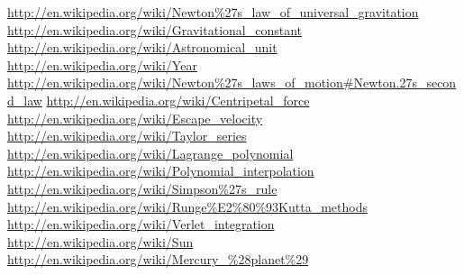 \documentclass[11pt,english,a4paper]{article}
\begin{document}
\begin{flushleft}
\begin{thebibliography}{1}
\href{http://en.wikipedia.org/wiki/Newton\%27s\_law\_of\_universal\_gravitation}{http://en.wikipedia.org/wiki/Newton\%27s\_law\_of\_universal\_gravitation}
\href{http://en.wikipedia.org/wiki/Gravitational\_constant}{http://en.wikipedia.org/wiki/Gravitational\_constant}
\href{http://en.wikipedia.org/wiki/Astronomical\_unit}{http://en.wikipedia.org/wiki/Astronomical\_unit}
\href{http://en.wikipedia.org/wiki/Year}{http://en.wikipedia.org/wiki/Year}
\href{http://en.wikipedia.org/wiki/Newton\%27s\_laws\_of\_motion\#Newton.27s\_second\_law}{http://en.wikipedia.org/wiki/Newton\%27s\_laws\_of\_motion\#Newton.27s\_second\_law}
\href{http://en.wikipedia.org/wiki/Centripetal\_force}{http://en.wikipedia.org/wiki/Centripetal\_force}
\href{http://en.wikipedia.org/wiki/Escape\_velocity}{http://en.wikipedia.org/wiki/Escape\_velocity}
\href{http://en.wikipedia.org/wiki/Taylor\_series}{http://en.wikipedia.org/wiki/Taylor\_series}
\href{http://en.wikipedia.org/wiki/Lagrange\_polynomial}{http://en.wikipedia.org/wiki/Lagrange\_polynomial}
\href{http://en.wikipedia.org/wiki/Polynomial\_interpolation}{http://en.wikipedia.org/wiki/Polynomial\_interpolation}
\href{http://en.wikipedia.org/wiki/Simpson\%27s\_rule}{http://en.wikipedia.org/wiki/Simpson\%27s\_rule}
\href{http://en.wikipedia.org/wiki/Runge\%E2\%80\%93Kutta\_methods}{http://en.wikipedia.org/wiki/Runge\%E2\%80\%93Kutta\_methods}
\href{http://en.wikipedia.org/wiki/Verlet\_integration}{http://en.wikipedia.org/wiki/Verlet\_integration}
\href{http://en.wikipedia.org/wiki/Sun}{http://en.wikipedia.org/wiki/Sun}
\href{http://en.wikipedia.org/wiki/Mercury\_\%28planet\%29}{http://en.wikipedia.org/wiki/Mercury\_\%28planet\%29}

\end{thebibliography}
\end{flushleft}
\end{document}
